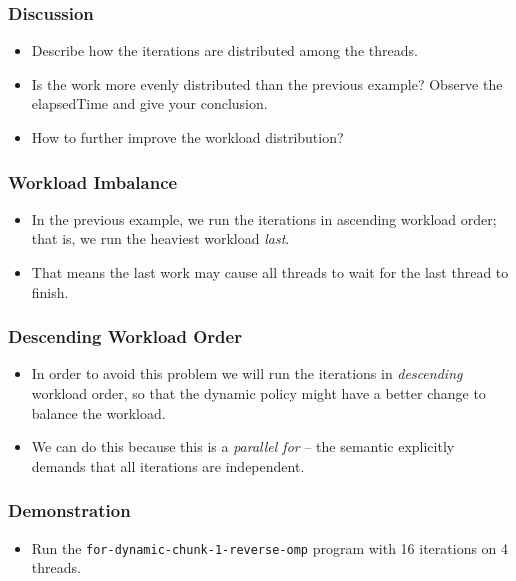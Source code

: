 \documentclass{beamer}
\begin{document}
\begin{frame}
  \frametitle{Discussion}
  \begin{itemize}
  \item Describe how the iterations are distributed among the threads.
  \item Is the work more evenly distributed than the previous example?
    Observe the elapsedTime and give your conclusion.
  \item How to further improve the workload distribution?
  \end{itemize}
\end{frame}


\begin{frame}
  \frametitle{Workload Imbalance}
  \begin{itemize}
  \item In the previous example, we run the iterations in ascending workload order; that is, we run the heaviest workload {\em last}.
  \item That means the last work may cause all threads to wait for the last thread to finish.
  \end{itemize}
\end{frame}

\begin{frame}
  \frametitle{Descending Workload Order}
  \begin{itemize}
  \item In order to avoid this problem we will run the iterations in
    {\em descending} workload order, so that the dynamic policy might
    have a better change to balance the workload.
  \item We can do this because this is a {\em parallel for} -- the
    semantic explicitly demands that all iterations are independent.
  \end{itemize}
\end{frame}

\begin{frame}
\end{frame}

\begin{frame}
  \frametitle{Demonstration}
  \begin{itemize}
  \item Run the {\tt for-dynamic-chunk-1-reverse-omp} program with 16
    iterations on 4 threads.
  \end{itemize}
\end{frame}
\end{document}
